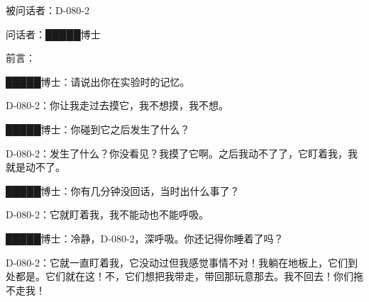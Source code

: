 

\begin{scpbox}

被问话者：D-080-2

问话者：█████博士

前言：


█████博士：请说出你在实验时的记忆。

D-080-2：你让我走过去摸它，我不想摸，我不想。

█████博士：你碰到它之后发生了什么？

D-080-2：发生了什么？你没看见？我摸了它啊。之后我动不了了，它盯着我，我就是动不了。

█████博士：你有几分钟没回话，当时出什么事了？

D-080-2：它就盯着我，我不能动也不能呼吸。

█████博士：冷静，D-080-2，深呼吸。你还记得你睡着了吗？

D-080-2：它就一直盯着我，它没动过但我感觉事情不对！我躺在地板上，它们到处都是。它们就在这！不，它们想把我带走，带回那玩意那去。我不回去！你们拖不走我！



\end{scpbox}
